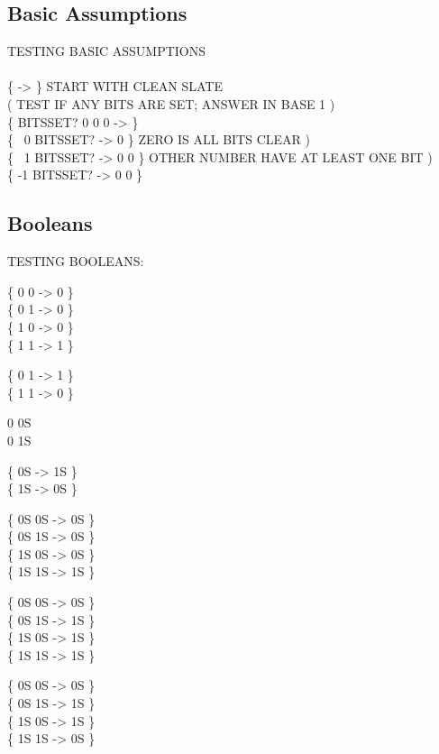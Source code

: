 \subsection{Basic Assumptions}

\begin{tt}
TESTING BASIC ASSUMPTIONS \\
\\
\{ -> \} \tab[8]  START WITH CLEAN SLATE \\
( TEST IF ANY BITS ARE SET; ANSWER IN BASE 1 ) \\
\{ \word{:} BITSSET?  0 0  0  \word{;} -> \} \\
\{ ~0 BITSSET? -> 0 \}		\tab[2.2]  ZERO IS ALL BITS CLEAR ) \\
\{ ~1 BITSSET? -> 0 0 \}	\tab[1.0]  OTHER NUMBER HAVE AT LEAST ONE BIT ) \\
\{ -1 BITSSET? -> 0 0 \}
\end{tt}

\subsection{Booleans}

\begin{tt}
TESTING BOOLEANS:    

\{ 0 0  -> 0 \} \\
\{ 0 1  -> 0 \} \\
\{ 1 0  -> 0 \} \\
\{ 1 1  -> 1 \}

\{ 0  1  -> 1 \} \\
\{ 1  1  -> 0 \}

0 \tab[3.6]  0S \\
0   1S

\{ 0S  -> 1S \} \\
\{ 1S  -> 0S \}

\{ 0S 0S  -> 0S \} \\
\{ 0S 1S  -> 0S \} \\
\{ 1S 0S  -> 0S \} \\
\{ 1S 1S  -> 1S \}

\{ 0S 0S  -> 0S \} \\
\{ 0S 1S  -> 1S \} \\
\{ 1S 0S  -> 1S \} \\
\{ 1S 1S  -> 1S \}

\{ 0S 0S  -> 0S \} \\
\{ 0S 1S  -> 1S \} \\
\{ 1S 0S  -> 1S \} \\
\{ 1S 1S  -> 0S \}
\end{tt}

